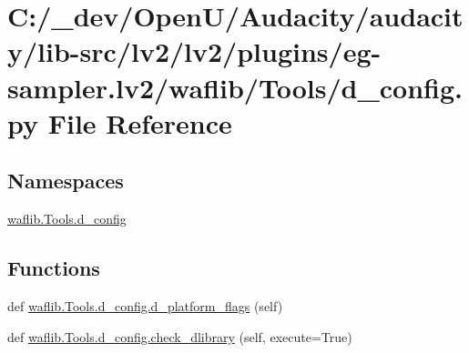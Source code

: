 \hypertarget{lv2_2plugins_2eg-sampler_8lv2_2waflib_2_tools_2d__config_8py}{}\section{C\+:/\+\_\+dev/\+Open\+U/\+Audacity/audacity/lib-\/src/lv2/lv2/plugins/eg-\/sampler.lv2/waflib/\+Tools/d\+\_\+config.py File Reference}
\label{lv2_2plugins_2eg-sampler_8lv2_2waflib_2_tools_2d__config_8py}
\subsection*{Namespaces}
\begin{DoxyCompactItemize}
\item 
 \hyperlink{namespacewaflib_1_1_tools_1_1d__config}{waflib.\+Tools.\+d\+\_\+config}
\end{DoxyCompactItemize}
\subsection*{Functions}
\begin{DoxyCompactItemize}
\item 
def \hyperlink{namespacewaflib_1_1_tools_1_1d__config_a430d331781f08b8478d542b708c4ccf4}{waflib.\+Tools.\+d\+\_\+config.\+d\+\_\+platform\+\_\+flags} (self)
\item 
def \hyperlink{namespacewaflib_1_1_tools_1_1d__config_ae2009fc7aeda344482ce8fc8eae64f49}{waflib.\+Tools.\+d\+\_\+config.\+check\+\_\+dlibrary} (self, execute=True)
\end{DoxyCompactItemize}
